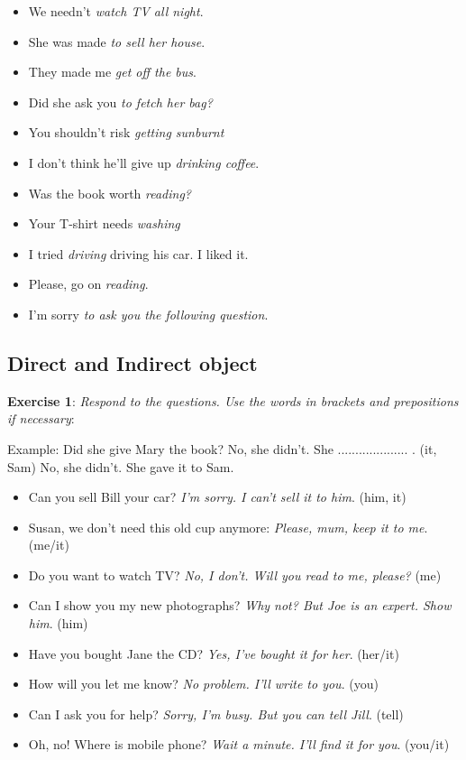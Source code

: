 \begin{itemize}

\item We needn't \textit{watch TV all night}.
\item She was made \textit{to sell her house}.
\item They made me \textit{get off the bus}.
\item Did she ask you \textit{to fetch her bag?}
\item You shouldn't risk \textit{getting sunburnt}
\item I don't think he'll give up \textit{drinking coffee}.
\item Was the book worth \textit{reading?}
\item Your T-shirt needs  \textit{washing}
\item I tried \textit{driving} driving his car. I liked it.
\item Please, go on \textit{reading}.
\item I'm sorry \textit{to ask you the following question}.

\end{itemize}

\subsection{Direct and Indirect object}

\textbf{Exercise 1}: \textit{Respond to the questions. Use the words in brackets and prepositions if necessary}:

Example:
Did she give Mary the book? 
No, she didn't. She .................... . (it, Sam)
No, she didn't. She gave it to Sam.

\begin{itemize}

\item Can you sell Bill your car? \textit{I'm sorry. I can't sell it to him}. (him, it)
\item Susan, we don't need this old cup anymore: \textit{Please, mum, keep it to me}. (me/it)
\item Do you want to watch TV? \textit{No, I don't. Will you read to me, please?} (me)
\item Can I show you my new photographs? \textit{Why not? But Joe is an expert. Show him}. (him)
\item Have you bought Jane the CD? \textit{Yes, I've bought it for her}. (her/it)
\item How will you let me know? \textit{No problem. I'll write to you}. (you)
\item Can I ask you for help? \textit{Sorry, I'm busy. But you can tell Jill}. (tell)
\item Oh, no! Where is mobile phone? \textit{Wait a minute. I'll find it for you}. (you/it)

\end{itemize}

